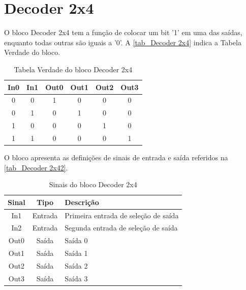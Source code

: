 \renewcommand{\NomeBloco}{Decoder 2x4}
\renewcommand{\NomePTab}{tab_\NomeBloco}
\renewcommand{\NomeSTab}{tab_\NomeBloco2}
\renewcommand{\NomePFig}{fig_\NomeBloco}
\renewcommand{\NomeSFig}{fig_\NomeBloco2}
\renewcommand{\NomeTTab}{tab_\NomeBloco3}

\section{\NomeBloco}

O bloco \NomeBloco{} tem a fun{\c c}\~ao de colocar um bit '1' em uma das sa\'idas, enquanto todas outras s\~ao iguais a '0'. A \autoref{\NomePTab} indica a Tabela Verdade do bloco.

\begin{table}[htbp]

\caption{Tabela Verdade do bloco \NomeBloco}%
\label{\NomePTab}
\centering
\begin{tabular}{cccccc}
    \toprule
    In0 & In1 & Out0 & Out1 & Out2 & Out3 \\
    \midrule \midrule
    0 & 0 & 1 & 0 & 0 & 0 \\
    \midrule
    0 & 1 & 0 & 1 & 0 & 0 \\
    \midrule
    1 & 0 & 0 & 0 & 1 & 0 \\
    \midrule
    1 & 1 & 0 & 0 & 0 & 1 \\
\bottomrule

\end{tabular}
\end{table}

O bloco apresenta as defini{\c c}\~oes de sinais de entrada e sa\'ida referidos na \autoref{\NomeSTab}.

\begin{table}[htbp]
\caption{Sinais do bloco \NomeBloco}
\label{\NomeSTab}
\centering
\begin{tabular}{ccl}

    \toprule
    Sinal & Tipo    & Descri{\c c}\~ao        \\
    \midrule \midrule
    In1    & Entrada & Primeira entrada de sele{\c c}\~ao de sa\'ida \\
    \midrule
    In2    & Entrada & Segunda entrada de sele{\c c}\~ao de sa\'ida \\
    \midrule
    Out0 & Sa\'ida & Sa\'ida 0\\
    \midrule
    Out1 & Sa\'ida & Sa\'ida 1\\
    \midrule
    Out2 & Sa\'ida & Sa\'ida 2\\
    \midrule
    Out3 & Sa\'ida & Sa\'ida 3\\
    \bottomrule
\end{tabular}
\end{table}

